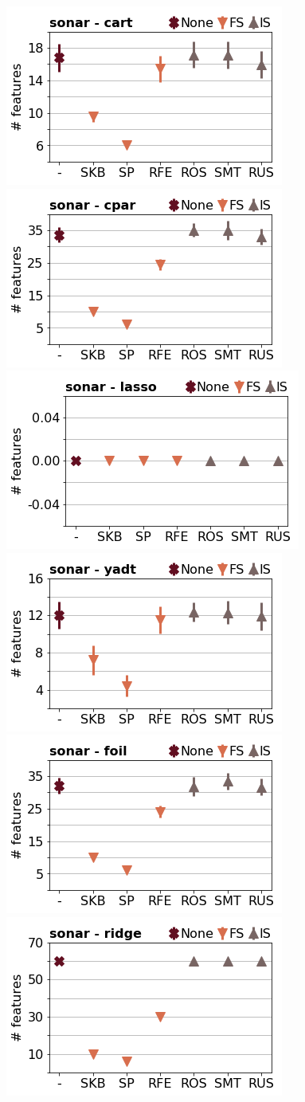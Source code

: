 \documentclass[runningheads,a4paper]{llncs}
\begin{document}
\begin{figure}[!h]
\includegraphics[width=0.32\linewidth]{fig/preps_sonar_DT_sklearn_nbr_features.png}
\includegraphics[width=0.32\linewidth]{fig/preps_sonar_RB_cpar_nbr_features.png}
\includegraphics[width=0.32\linewidth]{fig/preps_sonar_LM_lasso_nbr_features.png}
\includegraphics[width=0.32\linewidth]{fig/preps_sonar_DT_yadt_nbr_features.png}
\includegraphics[width=0.32\linewidth]{fig/preps_sonar_RB_foil_nbr_features.png}
\includegraphics[width=0.32\linewidth]{fig/preps_sonar_LM_ridge_nbr_features.png}
\end{figure}
\end{document}
